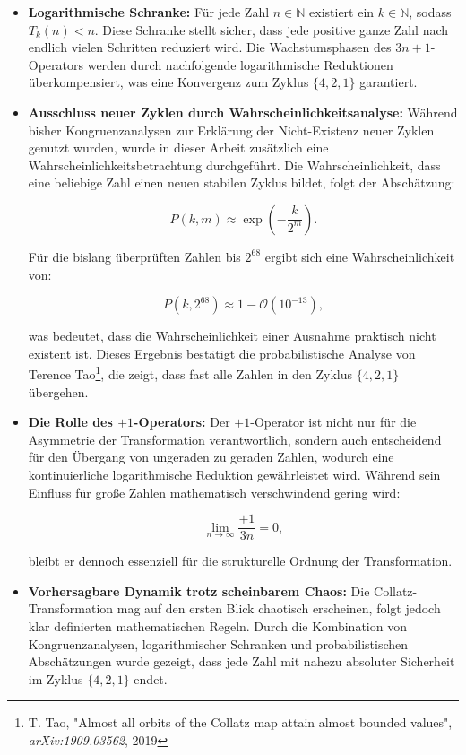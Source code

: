 \documentclass[a4paper,12pt]{article}
\begin{document}
\begin{itemize}
    \item \textbf{Logarithmische Schranke:} Für jede Zahl \( n \in \mathbb{N} \) existiert ein \( k \in \mathbb{N} \), sodass \( T_k(n) < n \). Diese Schranke stellt sicher, dass jede positive ganze Zahl nach endlich vielen Schritten reduziert wird. Die Wachstumsphasen des \( 3n+1 \)-Operators werden durch nachfolgende logarithmische Reduktionen überkompensiert, was eine Konvergenz zum Zyklus \( \{4, 2, 1\} \) garantiert.

    \item \textbf{Ausschluss neuer Zyklen durch Wahrscheinlichkeitsanalyse:} Während bisher Kongruenzanalysen zur Erklärung der Nicht-Existenz neuer Zyklen genutzt wurden, wurde in dieser Arbeit zusätzlich eine Wahrscheinlichkeitsbetrachtung durchgeführt. Die Wahrscheinlichkeit, dass eine beliebige Zahl einen neuen stabilen Zyklus bildet, folgt der Abschätzung:
    
    \[
    P(k,m) \approx \exp\left(-\frac{k}{2^m}\right).
    \]

    Für die bislang überprüften Zahlen bis \( 2^{68} \) ergibt sich eine Wahrscheinlichkeit von:

    \[
    P(k, 2^{68}) \approx 1 - \mathcal{O}(10^{-13}),
    \]

    was bedeutet, dass die Wahrscheinlichkeit einer Ausnahme praktisch nicht existent ist. Dieses Ergebnis bestätigt die probabilistische Analyse von Terence Tao\footnote{T. Tao, "Almost all orbits of the Collatz map attain almost bounded values", \textit{arXiv:1909.03562}, 2019}, die zeigt, dass fast alle Zahlen in den Zyklus \( \{4,2,1\} \) übergehen.

    \item \textbf{Die Rolle des \(+1\)-Operators:} Der \(+1\)-Operator ist nicht nur für die Asymmetrie der Transformation verantwortlich, sondern auch entscheidend für den Übergang von ungeraden zu geraden Zahlen, wodurch eine kontinuierliche logarithmische Reduktion gewährleistet wird. Während sein Einfluss für große Zahlen mathematisch verschwindend gering wird:

    \[
    \lim_{n \to \infty} \frac{+1}{3n} = 0,
    \]

    bleibt er dennoch essenziell für die strukturelle Ordnung der Transformation.

    \item \textbf{Vorhersagbare Dynamik trotz scheinbarem Chaos:} Die Collatz-Transformation mag auf den ersten Blick chaotisch erscheinen, folgt jedoch klar definierten mathematischen Regeln. Durch die Kombination von Kongruenzanalysen, logarithmischer Schranken und probabilistischen Abschätzungen wurde gezeigt, dass jede Zahl mit nahezu absoluter Sicherheit im Zyklus \( \{4,2,1\} \) endet.
\end{itemize}
\end{document}
